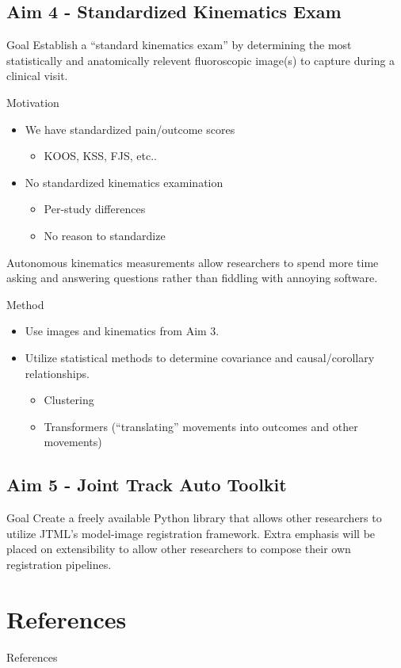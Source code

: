 \documentclass[presentation, aspectratio=1610]{beamer}
\begin{document}
\subsection{Aim 4 - Standardized Kinematics Exam}
\label{sec:orgbc3fd0e}
\begin{frame}[label={sec:orgc02c756}]{Goal}
Establish a ``standard kinematics exam'' by determining the most statistically and anatomically relevent fluoroscopic image(s) to capture during a clinical visit.
\end{frame}
\begin{frame}[label={sec:org22f1df2}]{Motivation}
\begin{itemize}
\item We have standardized pain/outcome scores
\begin{itemize}
\item KOOS, KSS, FJS, etc..
\end{itemize}
\item No standardized kinematics examination
\begin{itemize}
\item Per-study differences
\item No reason to standardize
\end{itemize}
\end{itemize}

Autonomous kinematics measurements allow researchers to spend more time asking and answering questions rather than fiddling with annoying software.
\end{frame}

\begin{frame}[label={sec:org0cd8f7f}]{Method}
\begin{itemize}
\item Use images and kinematics from Aim 3.
\item Utilize statistical methods to determine covariance and causal/corollary relationships.
\begin{itemize}
\item Clustering
\item Transformers \autocites{carionEndtoEndObjectDetection2020}[][]{vaswaniAttentionAllYou2017}[][]{guoAttentionMechanismsComputer2021}[][]{dosovitskiyImageWorth16x162021} (``translating'' movements into outcomes and other movements)
\end{itemize}
\end{itemize}
\end{frame}
\subsection{Aim 5 - Joint Track Auto Toolkit}
\label{sec:org03634c1}
\begin{frame}[label={sec:orgba89acd}]{Goal}
Create a freely available Python library that allows other researchers to utilize JTML's model-image registration framework. Extra emphasis will be placed on extensibility to allow other researchers to compose their own registration pipelines.
\end{frame}
\section{References}
\label{sec:org2741416}
\begin{frame}[label={sec:org3a28dc4},fragile, allowframebreaks, label=]{References}
\AtNextBibliography{\tiny}
\printbibliography
\end{frame}
\end{document}
